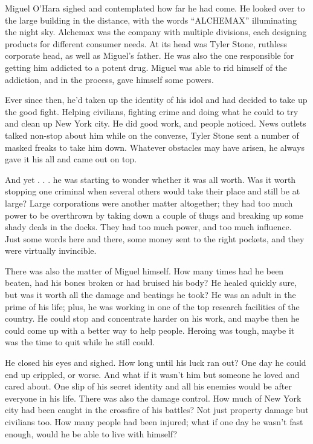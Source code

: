 Miguel O’Hara sighed and contemplated how far he had come. He looked over to the large building in the distance, with the words ``ALCHEMAX'' illuminating the night sky. Alchemax was the company with multiple divisions, each designing products for different consumer needs. At its head was Tyler Stone, ruthless corporate head, as well as Miguel’s father. He was also the one responsible for getting him addicted to a potent drug. Miguel was able to rid himself of the addiction, and in the process, gave himself some powers.

Ever since then, he’d taken up the identity of his idol and had decided to take up the good fight. Helping civilians, fighting crime and doing what he could to try and clean up New York city. He did good work, and people noticed. News outlets talked non-stop about him while on the converse, Tyler Stone sent a number of masked freaks to take him down. Whatever obstacles may have arisen, he always gave it his all and came out on top.

And yet . . . he was starting to wonder whether it was all worth. Was it worth stopping one criminal when several others would take their place and still be at large? Large corporations were another matter altogether; they had too much power to be overthrown by taking down a couple of thugs and breaking up some shady deals in the docks. They had too much power, and too much influence. Just some words here and there, some money sent to the right pockets, and they were virtually invincible.

There was also the matter of Miguel himself. How many times had he been beaten, had his bones broken or had bruised his body? He healed quickly sure, but was it worth all the damage and beatings he took? He was an adult in the prime of his life; plus, he was working in one of the top research facilities of the country. He could stop and concentrate harder on his work, and maybe then he could come up with a better way to help people. Heroing was tough, maybe it was the time to quit while he still could.

He closed his eyes and sighed. How long until his luck ran out? One day he could end up crippled, or worse. And what if it wasn’t him but someone he loved and cared about. One slip of his secret identity and all his enemies would be after everyone in his life. There was also the damage control. How much of New York city had been caught in the crossfire of his battles? Not just property damage but civilians too. How many people had been injured; what if one day he wasn’t fast enough, would he be able to live with himself?

